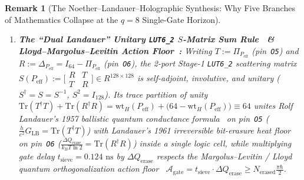 \documentclass[11pt,letterpaper]{article}
\providecommand{\StageOneNs}{\ensuremath{0.124\text{~ns}}}
\providecommand{\StageOneSieveDelayNs}{\StageOneNs}
\theoremstyle{spectralthm}
\newtheorem{remark}[theorem]{Remark}
\begin{document}
\begin{remark}[The Noether--Landauer--Holographic Synthesis: Why Five Branches of Mathematics Collapse at the $q=8$ Single-Gate Horizon]
\begin{enumerate}[leftmargin=1.4em,label=\textup{(\roman*)},topsep=2.5pt,itemsep=2pt]
  \item \textbf{The ``Dual Landauer'' Unitary \texttt{LUT6\_2} $S$-Matrix Sum Rule~\cite{1, landauer1957spatial} \& Lloyd--Margolus--Levitin Action Floor~\cite{margolus1998maximum}:} Writing $T := \Pi_{P_{\mathrm{eff}}}$ (pin~\texttt{O5}) and $R := \Delta_{P_{\mathrm{eff}}} = I_{64} - \Pi_{P_{\mathrm{eff}}}$ (pin~\texttt{O6}), the 2-port Stage-1 \mbox{\texttt{LUT6\_2}} scattering matrix $S(P_{\mathrm{eff}}) := \bigl[\begin{smallmatrix} R & T \\ T & R \end{smallmatrix}\bigr] \in R^{128 \times 128}$ is self-adjoint, involutive, and unitary ($S^\dagger = S = S^{-1}$, $S^2 = I_{128}$). Its trace partition of unity $\mathrm{Tr}(T^\dagger T) + \mathrm{Tr}(R^\dagger R) = \mathrm{wt}_H(P_{\mathrm{eff}}) + \bigl(64 - \mathrm{wt}_H(P_{\mathrm{eff}})\bigr) \equiv 64$ unites Rolf Landauer's 1957 ballistic quantum conductance formula~\cite{landauer1957spatial} on pin~\texttt{O5} ($\frac{h}{e^2}G_{\mathrm{LB}} = \mathrm{Tr}(T^\dagger T)$) with Landauer's 1961 irreversible bit-erasure heat floor~\cite{1} on pin~\texttt{O6} ($\frac{\Delta Q_{\mathrm{erase}}}{k_B T \ln 2} = \mathrm{Tr}(R^\dagger R)$) inside a single logic cell, while multiplying gate delay $t_{\mathrm{sieve}} = \StageOneSieveDelayNs$ by $\Delta Q_{\mathrm{erase}}$ respects the Margolus--Levitin / Lloyd quantum orthogonalization action floor~\cite{margolus1998maximum} $\mathcal{A}_{\mathrm{gate}} = t_{\mathrm{sieve}}\cdot\Delta Q_{\mathrm{erase}} \ge N_{\mathrm{erased}}\frac{\pi\hbar}{2}$.

\end{enumerate}
\end{remark}
\end{document}
